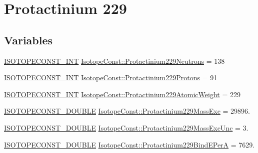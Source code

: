 \hypertarget{group___isotope_const-_protactinium-_pa229}{}\section{Protactinium 229}
\label{group___isotope_const-_protactinium-_pa229}
\subsection*{Variables}
\begin{DoxyCompactItemize}
\item 
\mbox{\hyperlink{group___isotope_const-_macros_ga5f18360b3e99483a35c32d789e62621c}{I\+S\+O\+T\+O\+P\+E\+C\+O\+N\+S\+T\+\_\+\+I\+NT}} \mbox{\hyperlink{group___isotope_const-_protactinium-_pa229_gaa9a1c1577894c7d196237bdd688dac37}{Isotope\+Const\+::\+Protactinium229\+Neutrons}} = 138
\item 
\mbox{\hyperlink{group___isotope_const-_macros_ga5f18360b3e99483a35c32d789e62621c}{I\+S\+O\+T\+O\+P\+E\+C\+O\+N\+S\+T\+\_\+\+I\+NT}} \mbox{\hyperlink{group___isotope_const-_protactinium-_pa229_gafcbb7d91257b5941d2965d4bda73336d}{Isotope\+Const\+::\+Protactinium229\+Protons}} = 91
\item 
\mbox{\hyperlink{group___isotope_const-_macros_ga5f18360b3e99483a35c32d789e62621c}{I\+S\+O\+T\+O\+P\+E\+C\+O\+N\+S\+T\+\_\+\+I\+NT}} \mbox{\hyperlink{group___isotope_const-_protactinium-_pa229_ga9f49df622f433f361b9879e148a4362f}{Isotope\+Const\+::\+Protactinium229\+Atomic\+Weight}} = 229
\item 
\mbox{\hyperlink{group___isotope_const-_macros_ga8f45a7272ce02c0b4c65c44636ed719a}{I\+S\+O\+T\+O\+P\+E\+C\+O\+N\+S\+T\+\_\+\+D\+O\+U\+B\+LE}} \mbox{\hyperlink{group___isotope_const-_protactinium-_pa229_gaa379dff86245109a5a2f245fb5edcbdb}{Isotope\+Const\+::\+Protactinium229\+Mass\+Exc}} = 29896.
\item 
\mbox{\hyperlink{group___isotope_const-_macros_ga8f45a7272ce02c0b4c65c44636ed719a}{I\+S\+O\+T\+O\+P\+E\+C\+O\+N\+S\+T\+\_\+\+D\+O\+U\+B\+LE}} \mbox{\hyperlink{group___isotope_const-_protactinium-_pa229_ga9c953ce93d07e023c19ed70083883a8e}{Isotope\+Const\+::\+Protactinium229\+Mass\+Exc\+Unc}} = 3.
\item 
\mbox{\hyperlink{group___isotope_const-_macros_ga8f45a7272ce02c0b4c65c44636ed719a}{I\+S\+O\+T\+O\+P\+E\+C\+O\+N\+S\+T\+\_\+\+D\+O\+U\+B\+LE}} \mbox{\hyperlink{group___isotope_const-_protactinium-_pa229_ga4e56fa4eb7d2c1ec48178d62d9fad1b7}{Isotope\+Const\+::\+Protactinium229\+Bind\+E\+PerA}} = 7629.

\end{DoxyCompactItemize}
